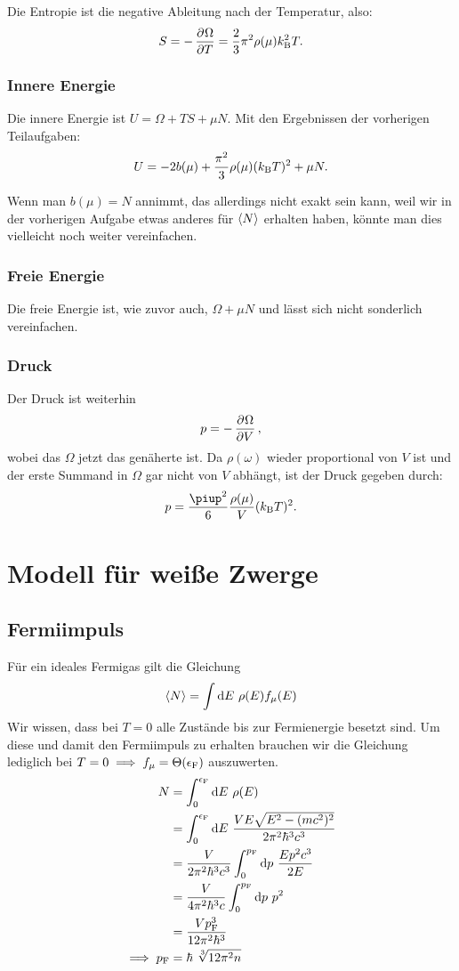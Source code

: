 Die Entropie ist die negative Ableitung nach der Temperatur, also:
\[
    S = - \dpd \Omega T = \frac 23 \pi^2 \rho(\mu) \kB^2 T.
\]

\subsubsection{Innere Energie}

Die innere Energie ist $U = \Omega + TS + \mu N$. Mit den Ergebnissen der
vorherigen Teilaufgaben:
\[
    U = - 2 b(\mu) + \frac{\pi^2}3 \rho(\mu) (k_\text B T)^2 + \mu N.
\]

Wenn man $b(\mu) = N$ annimmt, das allerdings nicht exakt sein kann, weil wir
in der vorherigen Aufgabe etwas anderes für $\langle N \rangle$ erhalten haben,
könnte man dies vielleicht noch weiter vereinfachen.

\subsubsection{Freie Energie}

Die freie Energie ist, wie zuvor auch, $\Omega + \mu N$ und lässt sich nicht
sonderlich vereinfachen.

\subsubsection{Druck}

Der Druck ist weiterhin
\[
    p = - \dpd \Omega V,
\]
wobei das $\Omega$ jetzt das genäherte ist. Da $\rho(\omega)$ wieder
proportional von $V$ ist und der erste Summand in $\Omega$ gar nicht von $V$
abhängt, ist der Druck gegeben durch:
\[
    p = \frac{\piup^2}6 \frac{\rho(\mu)}V (\kB T)^2.
\]

\section{Modell für weiße Zwerge}

\subsection{Fermiimpuls}
Für ein ideales Fermigas gilt die Gleichung 
\[ \bracket N = \int \dif E \ \rho(E) f_\mu(E) \]
Wir wissen, dass bei $T=0$ alle Zustände bis zur Fermienergie besetzt sind. Um diese und damit den Fermiimpuls zu erhalten brauchen wir die Gleichung lediglich bei $T=0 \implies f_\mu=\Theta(\epsilon_{\text F})$ auszuwerten.
\begin{align*}
N &= \int_0^{\epsilon_{\text F}} \dif E \ \rho(E) \\
&= \int_0^{\epsilon_{\text F}} \dif E \ \frac{VE \sqrt{E^2-(mc^2)^2}}{2\pi^2\hbar^3c^3} \\
&= \frac{V}{2\pi^2\hbar^3c^3} \int_0^{p_{\text F}} \dif p \ \frac{Ep^2c^3}{2E} \\
&= \frac{V}{4\pi^2\hbar^3c} \int_0^{p_{\text F}} \dif p \ p^2 \\
&= \frac{Vp_{\text F}^3}{12\pi^2\hbar^3} \\
\implies p_{\text F} &= \hbar \ \sqrt[3]{12\pi^2 n}
\end{align*}

